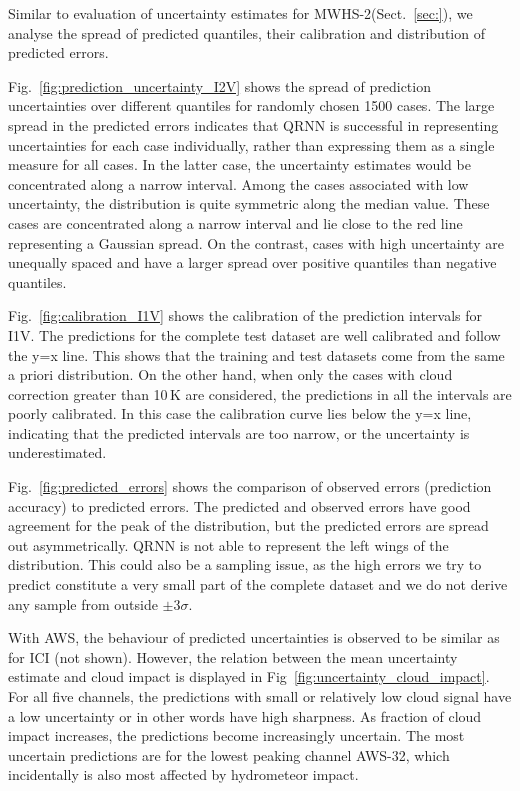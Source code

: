 \documentclass[amt]{copernicus}
\begin{document}
Similar to evaluation of uncertainty estimates for MWHS-2(Sect.~\ref{sec:}), we analyse the spread of predicted quantiles, their calibration and distribution of predicted errors. 

Fig.~\ref{fig:prediction_uncertainty_I2V} shows the spread of prediction uncertainties over different quantiles for randomly chosen 1500 cases. The large spread in the predicted errors indicates that QRNN is successful in representing uncertainties for each case individually, rather than expressing them as a single measure for all cases. In the latter case, the uncertainty estimates would be concentrated along a narrow interval. Among the cases associated with low uncertainty, the distribution is quite symmetric along the median value. These cases are concentrated along a narrow interval and lie close to the red line representing a Gaussian spread. On the contrast, cases with high uncertainty are unequally spaced and have a larger spread over positive quantiles than negative quantiles. 

Fig.~\ref{fig:calibration_I1V} shows the calibration of the prediction intervals for I1V. The predictions for the complete test dataset are well calibrated and follow the y=x line. This shows that the training and test datasets come from the same a priori distribution. On the other hand, when only the cases with  cloud correction greater than 10\,K are considered, the predictions in all the intervals are poorly calibrated. In this case the calibration curve lies below the y=x line, indicating that the predicted intervals are too narrow, or the uncertainty is underestimated. 

Fig.~\ref{fig:predicted_errors} shows the comparison of observed errors (prediction accuracy) to predicted errors. The predicted and observed errors have good agreement for the peak of the distribution, but the predicted errors are spread out asymmetrically. QRNN is not able to represent the left wings of the distribution. This could also be a sampling issue, as the high errors we try to predict constitute a very small part of the complete dataset and we do not derive any sample from outside $\pm3\sigma$.   

With AWS, the behaviour of predicted uncertainties is observed to be similar as for ICI (not shown). However, the relation between the mean uncertainty estimate and cloud impact is displayed in Fig~\ref{fig:uncertainty_cloud_impact}. For all five channels, the predictions with small or relatively low cloud signal have a low uncertainty or in other words have high sharpness. As fraction of cloud impact increases, the predictions become increasingly uncertain. The most uncertain predictions are for the lowest peaking channel AWS-32, which incidentally is also most affected by  hydrometeor impact.  
\end{document}
